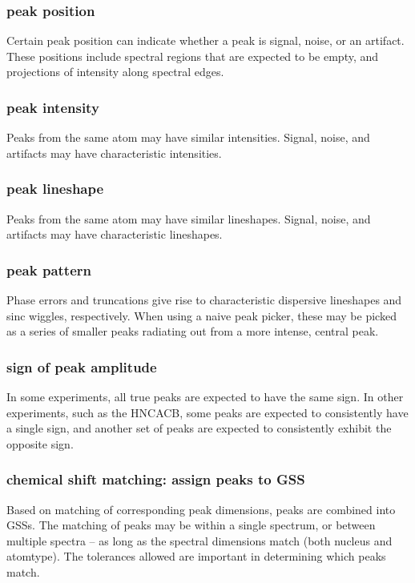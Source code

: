 \subsubsection{peak position}
Certain peak position can indicate whether a peak is signal, noise, or an 
artifact.  These positions include spectral regions that are expected to be 
empty, and projections of intensity along spectral edges.

\subsubsection{peak intensity}
Peaks from the same atom may have similar intensities. 
Signal, noise, and artifacts may have characteristic intensities.

\subsubsection{peak lineshape}
Peaks from the same atom may have similar lineshapes.
Signal, noise, and artifacts may have characteristic lineshapes.
 
\subsubsection{peak pattern}
Phase errors and truncations give rise to characteristic dispersive lineshapes
and sinc wiggles, respectively.  When using a naive peak picker, these may
be picked as a series of smaller peaks radiating out from a more intense,
central peak.

\subsubsection{sign of peak amplitude}
In some experiments, all true peaks are expected to have the same sign.  In
other experiments, such as the HNCACB, some peaks are expected to consistently
have a single sign, and another set of peaks are expected to consistently 
exhibit the opposite sign.

\subsubsection{chemical shift matching: assign peaks to GSS}
Based on matching of corresponding peak dimensions, peaks are combined into
GSSs.  The matching of peaks may be within a single spectrum, or between 
multiple spectra -- as long as the spectral dimensions match (both nucleus
and atomtype).  The tolerances allowed are important in determining which
peaks match.

